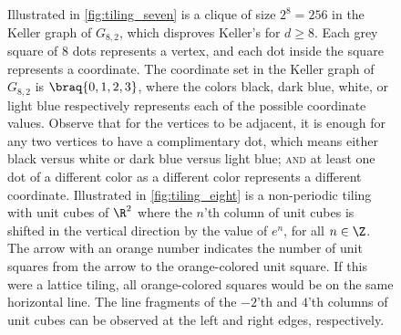 \begin{figure}[t!]
    \caption{Illustrated in \cref{fig:tiling_seven} is a clique of size $2^8=256$ in the Keller graph of $G_{8,2}$, which disproves Keller's  for $d\geq8$. Each grey square of $8$ dots represents a vertex, and each dot inside the square represents a coordinate. The coordinate set in the Keller graph of $G_{8,2}$ is $\braq{0,1,2,3}$, where the colors black, dark blue, white, or light blue respectively represents each of the possible coordinate values. Observe that for the vertices to be adjacent, it is enough for any two vertices to have a complimentary dot, which means either black versus white or dark blue versus light blue; \textsc{and} at least one dot of a different color as a different color represents a different coordinate. Illustrated in \cref{fig:tiling_eight} is a non-periodic tiling with unit cubes of $\R^2$ where the $n$'th column of unit cubes is shifted in the vertical direction by the value of $e^n$, for all $n\in\Z$. The arrow with an orange number indicates the number of unit squares from the arrow to the orange-colored unit square. If this were a lattice tiling, all orange-colored squares would be on the same horizontal line. The line fragments of the $-2$'th and $4$'th columns of unit cubes can be observed at the left and right edges, respectively.}
    \label{fig:tilings_seven_eight}
\end{figure}